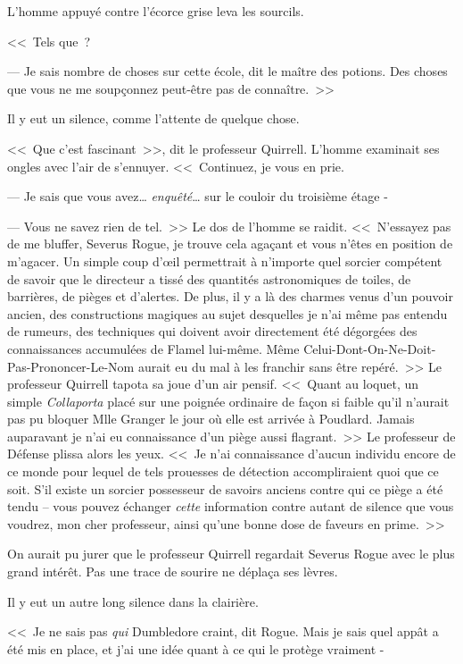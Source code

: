 L'homme appuyé contre l'écorce grise leva les sourcils.

<<~Tels que~?

--- Je sais nombre de choses sur cette école, dit le maître des potions. Des choses que vous ne me soupçonnez peut-être pas de connaître.~>>

Il y eut un silence, comme l'attente de quelque chose.

<<~Que c'est fascinant~>>, dit le professeur Quirrell. L'homme examinait ses ongles avec l'air de s'ennuyer. <<~Continuez, je vous en prie.

--- Je sais que vous avez… \emph{enquêté}… sur le couloir du troisième étage -

--- Vous ne savez rien de tel.~>> Le dos de l'homme se raidit. <<~N'essayez pas de me bluffer, Severus Rogue, je trouve cela agaçant et vous n'êtes en position de m'agacer. Un simple coup d'œil permettrait à n'importe quel sorcier compétent de savoir que le directeur a tissé des quantités astronomiques de toiles, de barrières, de pièges et d'alertes. De plus, il y a là des charmes venus d'un pouvoir ancien, des constructions magiques au sujet desquelles je n'ai même pas entendu de rumeurs, des techniques qui doivent avoir directement été dégorgées des connaissances accumulées de Flamel lui-même. Même Celui-Dont-On-Ne-Doit-Pas-Prononcer-Le-Nom aurait eu du mal à les franchir sans être repéré.~>> Le professeur Quirrell tapota sa joue d'un air pensif. <<~Quant au loquet, un simple \emph{Collaporta} placé sur une poignée ordinaire de façon si faible qu'il n'aurait pas pu bloquer Mlle Granger le jour où elle est arrivée à Poudlard. Jamais auparavant je n'ai eu connaissance d'un piège aussi flagrant.~>> Le professeur de Défense plissa alors les yeux. <<~Je n'ai connaissance d'aucun individu encore de ce monde pour lequel de tels prouesses de détection accompliraient quoi que ce soit. S'il existe un sorcier possesseur de savoirs anciens contre qui ce piège a été tendu -- vous pouvez échanger \emph{cette} information contre autant de silence que vous voudrez, mon cher professeur, ainsi qu'une bonne dose de faveurs en prime.~>>

On aurait pu jurer que le professeur Quirrell regardait Severus Rogue avec le plus grand intérêt. Pas une trace de sourire ne déplaça ses lèvres.

Il y eut un autre long silence dans la clairière.

<<~Je ne sais pas \emph{qui} Dumbledore craint, dit Rogue. Mais je sais quel appât a été mis en place, et j'ai une idée quant à ce qui le protège vraiment -

